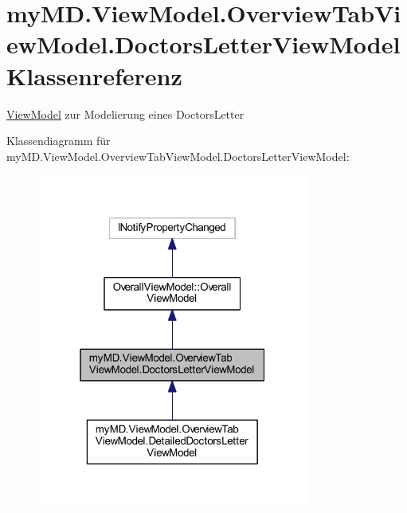 \hypertarget{classmy_m_d_1_1_view_model_1_1_overview_tab_view_model_1_1_doctors_letter_view_model}{}\section{my\+M\+D.\+View\+Model.\+Overview\+Tab\+View\+Model.\+Doctors\+Letter\+View\+Model Klassenreferenz}
\label{classmy_m_d_1_1_view_model_1_1_overview_tab_view_model_1_1_doctors_letter_view_model}


\mbox{\hyperlink{namespacemy_m_d_1_1_view_model}{View\+Model}} zur Modelierung eines Doctors\+Letter  




Klassendiagramm für my\+M\+D.\+View\+Model.\+Overview\+Tab\+View\+Model.\+Doctors\+Letter\+View\+Model\+:
\nopagebreak
\begin{figure}[H]
\begin{center}
\leavevmode
\includegraphics[width=253pt]{classmy_m_d_1_1_view_model_1_1_overview_tab_view_model_1_1_doctors_letter_view_model__inherit__graph}
\end{center}
\end{figure}


